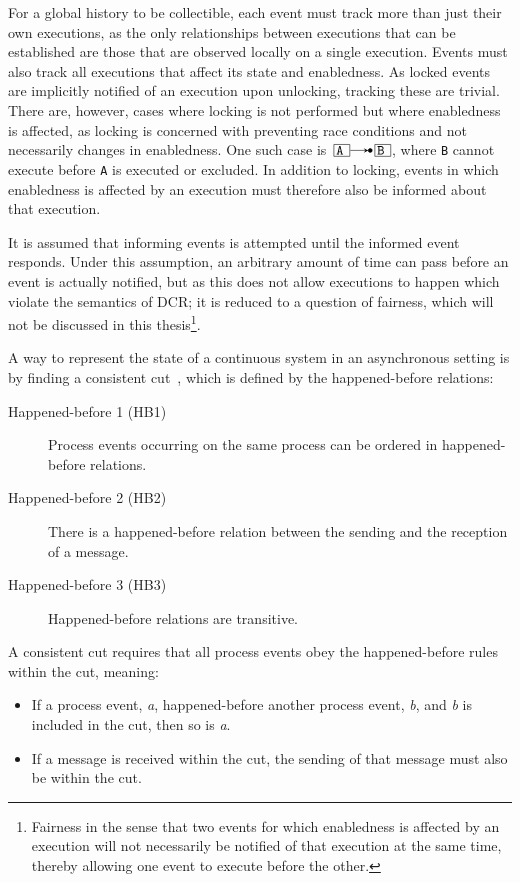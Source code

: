 \documentclass{article}
\begin{document}
	For a global history to be collectible, each event must track more than just their own executions, as the only relationships between executions that can be established are those that are observed locally on a single execution.
	Events must also track all executions that affect its state and enabledness.
	As locked events are implicitly notified of an execution upon unlocking, tracking these are trivial.
	There are, however, cases where locking is not performed but where enabledness is affected, as locking is concerned with preventing race conditions and not necessarily changes in enabledness.
	One such case is $\ev{A} \crel \ev{B}$, where \texttt{B} cannot execute before \texttt{A} is executed or excluded.
	In addition to locking, events in which enabledness is affected by an execution must therefore also be informed about that execution.

	It is assumed that informing events is attempted until the informed event responds.
	Under this assumption, an arbitrary amount of time can pass before an event is actually notified, but as this does not allow executions to happen which violate the semantics of DCR; it is reduced to a question of fairness, which will not be discussed in this thesis\footnote{Fairness in the sense that two events for which enabledness is affected by an execution will not necessarily be notified of that execution at the same time, thereby allowing one event to execute before the other.}.

	A way to represent the state of a continuous system in an asynchronous setting is by finding a consistent cut~\cite{lamport_time_1978}, which is defined by the happened-before relations:

	\begin{description}
		\item[Happened-before 1 (HB1)] Process events occurring on the same process can be ordered in happened-before relations.
		\item[Happened-before 2 (HB2)] There is a happened-before relation between the sending and the reception of a message.
		\item[Happened-before 3 (HB3)] Happened-before relations are transitive.
	\end{description}

	A consistent cut requires that all process events obey the happened-before rules within the cut, meaning:
	\begin{itemize}
		\item If a process event, \textit{a}, happened-before another process event, \textit{b}, and \textit{b} is included in the cut, then so is \textit{a}.
		\item If a message is received within the cut, the sending of that message must also be within the cut.
	\end{itemize}
\end{document}
